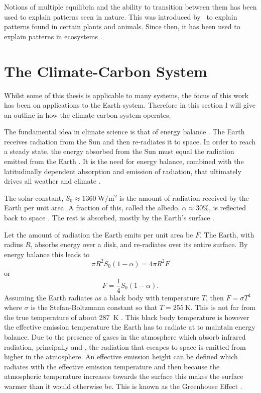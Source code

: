 Notions of multiple equilibria and the ability to transition between them has been used to explain patterns seen in nature. This was introduced by~\cite{Turing1952} to explain
patterns found in certain plants and animals. Since then, it has been used to explain patterns in ecosystems \parencite{Rietkerk2008}.

\section{The Climate-Carbon System}

Whilst some of this thesis is applicable to many systems, the focus of this work has been on applications to the Earth system. Therefore in this section I will give an outline in
how the climate-carbon system operates.

The fundamental idea in climate science is that of energy balance \parencite{North1981}. The Earth receives radiation from the Sun and then re-radiates it to space.
In order to reach a steady state, the energy absorbed from the Sun must equal the radiation emitted from the Earth \parencite{Peixoto1992}. It is the need for energy balance, combined with the
latitudinally dependent absorption and emission of radiation, that ultimately drives all weather and climate \parencite{Lorenz1967}.

The solar constant, $S_0 \approx \SI{1360}{\watt\per\meter\squared}$ \parencite{Johnson1954} is the amount of radiation received by the Earth per unit area.  A fraction of this,
called the albedo, $\alpha \approx 30\%$, is reflected back to space \parencite{Goode2021}. The rest is absorbed, mostly by the Earth's surface \parencite{Trenberth2009}.

Let the amount of radiation the Earth emits per unit area be $F$. The Earth, with radius $R$, absorbs energy over a disk, and re-radiates
over its entire surface. By energy balance this leads to
\begin{equation}
  \pi R^2 S_0 (1-\alpha) = 4 \pi R^2 F
\end{equation}
or
\begin{equation}
  \label{eq:energy_balance}
  F = \frac{1}{4} S_0 \left(1 - \alpha\right).
\end{equation}
Assuming the Earth radiates as a black body with temperature $T$, then $F = \sigma T^4$ where $\sigma$ is the Stefan-Boltzmann constant  so that $T = \SI{255}{\kelvin}$.
This is not far from the true temperature of about \SI{287}{\kelvin} \parencite{Jones1999}.
This black body temperature is however the effective emission temperature the Earth has to radiate at to maintain energy balance. Due to the presence of gases in the atmosphere which absorb
infrared radiation, principally  and , the radiation that escapes to space is emitted from higher in the atmosphere. An effective emission height can be defined which
radiates with the effective emission temperature and then because the atmospheric temperature increases towards the surface this makes the surface warmer than it would otherwise be.
This is known as the Greenhouse Effect \parencite{Pierrehumbert2010}.

